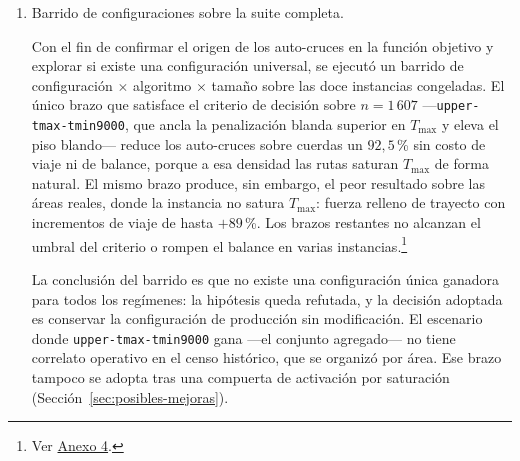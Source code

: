 \begin{enumerate}
La instancia agregada dispersa el arbolado en una extensión cercana a ocho veces la del área
individual mayor (Sección~\ref{sec:protocolo-evaluacion}), y tratar esa unión como un único trabajo
de ruteo carece de correlato operativo. Para los
auto-cruces, la serie por área de la Sección~\ref{sec:areas-reales} acota lo que ese régimen
significa: el agregado no produce más auto-cruces por ruta, sino más rutas y, con ellas, un conteo
absoluto mayor.

El peor par de rutas anunciado en la Sección~\ref{sec:comparacion-estrategias}, con un \textit{IoU}
de $0{,}55$, persiste con la estrategia \texttt{spatial\_term} porque su solapamiento responde a la
geometría local del par, y ningún coeficiente global lo elimina sin penalizar las rutas
circundantes; la solución estructural es la segmentación previa por área de censo.

El problema que la segmentación previa por área plantea ---repartir un territorio en distritos
compactos y equilibrados antes de rutear--- tiene tratamiento propio en la literatura bajo la
denominación de
diseño territorial \citep{kalcsics2005towards,rios2009reactive}.

\item Barrido de configuraciones sobre la suite completa.

Con el fin de confirmar el origen de los auto-cruces en la función objetivo y explorar si existe
una configuración universal, se ejecutó un barrido de configuración $\times$ algoritmo $\times$
tamaño sobre las doce instancias congeladas. El único brazo que satisface el criterio de decisión
sobre $n=1\,607$ ---\texttt{upper-tmax-tmin9000}, que ancla la penalización blanda superior en
$T_{\max}$ y eleva el piso blando--- reduce los auto-cruces sobre cuerdas un $92{,}5$\,\% sin costo
de viaje ni de balance, porque a esa densidad las rutas saturan $T_{\max}$ de forma natural. El
mismo brazo produce, sin embargo, el peor resultado sobre las áreas reales, donde la instancia no
satura $T_{\max}$: fuerza relleno de trayecto con incrementos de viaje de hasta $+89$\,\%. Los
brazos restantes no alcanzan el umbral del criterio o rompen el balance en varias
instancias.\footnote{Ver \hyperref[anx:barrido-configuraciones]{Anexo 4}.}

La conclusión del barrido es que no existe una configuración única ganadora para todos los
regímenes: la hipótesis queda refutada, y la decisión adoptada es conservar la configuración de
producción sin modificación. El escenario donde \texttt{upper-tmax-tmin9000} gana ---el conjunto
agregado--- no tiene correlato operativo en el censo histórico, que se organizó por área. Ese brazo
tampoco se adopta tras una compuerta de activación por saturación
(Sección~\ref{sec:posibles-mejoras}).

\end{enumerate}

